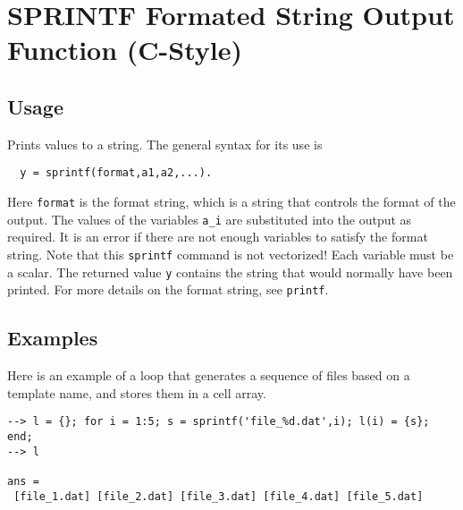 \section{SPRINTF Formated String Output Function (C-Style)}

\subsection{Usage}

Prints values to a string.  The general syntax for its use is
\begin{verbatim}
  y = sprintf(format,a1,a2,...).
\end{verbatim}
Here \verb|format| is the format string, which is a string that
controls the format of the output.  The values of the variables
\verb|a_i| are substituted into the output as required.  It is
an error if there are not enough variables to satisfy the format
string.  Note that this \verb|sprintf| command is not vectorized!  Each
variable must be a scalar.  The returned value \verb|y| contains the
string that would normally have been printed. For
more details on the format string, see \verb|printf|.  
\subsection{Examples}

Here is an example of a loop that generates a sequence of files based on
a template name, and stores them in a cell array.
\begin{verbatim}
--> l = {}; for i = 1:5; s = sprintf('file_%d.dat',i); l(i) = {s}; end;
--> l

ans = 
 [file_1.dat] [file_2.dat] [file_3.dat] [file_4.dat] [file_5.dat] 
\end{verbatim}
